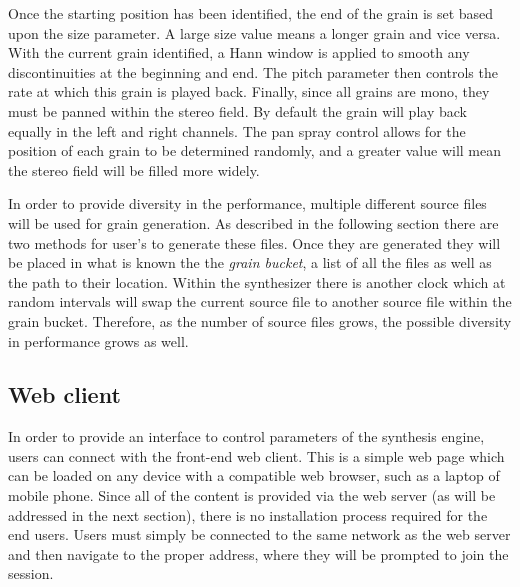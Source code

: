 \documentclass{nime-alternate}
\begin{document}
Once the starting position has been identified, the end of the grain is set
based upon the size parameter. A large size value means a longer grain and vice versa. 
With the current grain identified, a Hann window is applied to smooth any discontinuities at the beginning and end.
The pitch parameter then controls the rate at which this grain is played back. Finally, since all grains are
mono, they must be panned within the stereo field. By default the grain will play back equally in the left and right channels.
The pan spray control allows for the position of each grain to be determined randomly, and a greater value will mean 
the stereo field will be filled more widely. 

In order to provide diversity in the performance, multiple different source files will be used for grain generation. 
As described in the following section there are two methods for user's to generate these files. 
Once they are generated they will be placed in what is known the the \emph{grain bucket}, a list of all the files
as well as the path to their location. 
Within the synthesizer there is another clock which at random intervals 
will swap the current source file to another source file within the grain bucket. 
Therefore, as the number of source files grows, the possible diversity in performance grows as well.

\subsection{Web client}

In order to provide an interface to control parameters of the synthesis engine, users can connect with the front-end web client. 
This is a simple web page which can be loaded on any device with a compatible web browser, such as a laptop of mobile phone. 
Since all of the content is provided via the web server (as will be addressed in the next section),
there is no installation process required for the end users. Users must simply be connected to the 
same network as the web server and then navigate to the proper address, where they will be prompted to join the session. 
\end{document}
